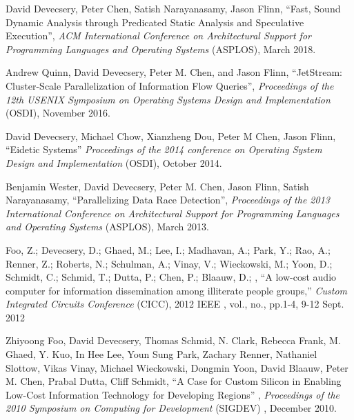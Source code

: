 \documentclass[margin, 10pt]{res} %
\begin{document}
\begin{resume}
David Devecsery, Peter Chen, Satish Narayanasamy, Jason Flinn, ``Fast,
Sound Dynamic Analysis through Predicated Static Analysis and
Speculative Execution'', {\sl ACM International Conference
on Architectural Support for Programming Languages and Operating
Systems} (ASPLOS), March 2018.

Andrew Quinn, David Devecsery, Peter M. Chen, and Jason Flinn,
``JetStream: Cluster-Scale Parallelization of Information Flow
Queries'', {\sl Proceedings of the 12th USENIX Symposium on Operating
Systems Design and Implementation} (OSDI), November 2016.

David Devecsery, Michael Chow, Xianzheng Dou, Peter M Chen, Jason
Flinn, ``Eidetic Systems'' {\sl Proceedings of the 2014 conference on
Operating System Design and Implementation} (OSDI), October 2014.

Benjamin Wester, David Devecsery, Peter M. Chen, Jason Flinn, Satish
Narayanasamy, ``Parallelizing Data Race Detection'', {\sl Proceedings
of the 2013 International Conference on Architectural Support for
Programming Languages and Operating Systems} (ASPLOS), March 2013.

Foo, Z.; Devecsery, D.; Ghaed, M.; Lee, I.; Madhavan, A.; Park, Y.;
Rao, A.; Renner, Z.; Roberts, N.; Schulman, A.; Vinay, V.; Wieckowski,
M.; Yoon, D.; Schmidt, C.; Schmid, T.; Dutta, P.; Chen, P.; Blaauw,
D.; , ``A low-cost audio computer for information dissemination among
illiterate people groups,'' {\sl Custom Integrated Circuits Conference}
(CICC), 2012 IEEE , vol., no., pp.1-4, 9-12 Sept. 2012

%

Zhiyoong Foo, David Devecsery, Thomas Schmid, N. Clark, Rebecca Frank,
M. Ghaed, Y. Kuo, In Hee Lee, Youn Sung Park, Zachary Renner,
Nathaniel Slottow, Vikas Vinay, Michael Wieckowski, Dongmin Yoon,
David Blaauw, Peter M. Chen, Prabal Dutta, Cliff Schmidt, ``A Case for
Custom Silicon in Enabling Low-Cost Information Technology for
Developing Regions'' , {\sl Proceedings of the 2010 Symposium on
Computing for Development} (SIGDEV) , December 2010.


\end{resume}
\end{document}
